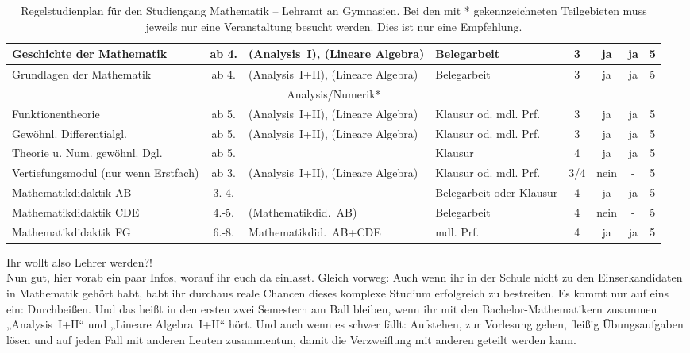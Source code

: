\begin{table}[tbp]
\begin{footnotesize}
\begin{tabularx}{\textwidth}{|@{~}X@{~}|@{~}c@{~}|@{~}X@{~}|@{~}X@{~}|@{~}c@{~}|@{~}c@{~}|@{~}c@{~}|@{~}c@{~}|}
        Geschichte der Mathe\-matik&ab 4.&(Analysis~I), (Lineare Algebra)&Beleg\-arbeit&3&ja&ja&5\\\hline
        Grund\-lagen der Mathe\-matik&ab 4.&(Analysis~I+II), (Lineare Algebra)&Beleg\-arbeit&3&ja&ja&5\\\hline\hline
        \multicolumn{8}{|c|}{Analysis/Numerik*}\\\hline
        Funktionen\-theorie&ab 5.&(Analysis~I+II), (Lineare Algebra)&Klausur od. mdl. Prf.&3&ja&ja&5\\\hline
        Gewöhnl. Differentialgl.&ab 5.&(Analysis~I+II), (Lineare Algebra)&Klausur od. mdl. Prf.&3&ja&ja&5\\\hline
        Theorie u. Num. gewöhnl. Dgl.&ab 5.&&Klausur&4&ja&ja&5\\\hline\hline
        Ver\-tiefungs\-modul (nur wenn Erst\-fach)&ab 3.&(Analysis~I+II), (Lineare Algebra)&Klausur od. mdl. Prf.&3/4&nein&-&5\\\hline
        Mathe\-matik\-didaktik AB&3.-4.&&Beleg\-arbeit oder Klausur&4&ja&ja&5\\\hline
        Mathe\-matik\-didaktik CDE&4.-5.&(Mathe\-matikdid.~AB)&Beleg\-arbeit&4&nein&-&5\\\hline
        Mathe\-matik\-didaktik FG&6.-8.&Mathe\-matik\-did.~AB+CDE&mdl. Prf.&4&ja&ja&5\\\hline
    \end{tabularx}
    \end{footnotesize}
        \caption{\label{plan-lag}Regelstudienplan für den Studiengang
    Mathematik -- Lehramt an Gymnasien. Bei den mit * gekennzeichneten
    Teilgebieten muss jeweils nur eine Veranstaltung besucht werden. Dies
    ist nur eine Empfehlung.}
\end{table}

Ihr wollt also Lehrer werden?!\\
Nun gut, hier vorab ein paar Infos, worauf ihr euch da einlasst.
Gleich vorweg: Auch wenn ihr in der Schule nicht zu den Einserkandidaten in Mathematik gehört habt, habt ihr durchaus reale Chancen dieses komplexe Studium erfolgreich zu bestreiten.
Es kommt nur auf eins ein: Durchbeißen.
Und das heißt in den ersten zwei Semestern am Ball bleiben, wenn ihr mit den Bachelor-Mathematikern zusammen „Analysis~I+II“ und „Lineare Algebra~I+II“ hört.
Und auch wenn es schwer fällt:
Aufstehen, zur Vorlesung gehen, fleißig Übungsaufgaben lösen und auf jeden Fall mit anderen Leuten zusammentun, damit die Verzweiflung mit anderen geteilt werden kann.

